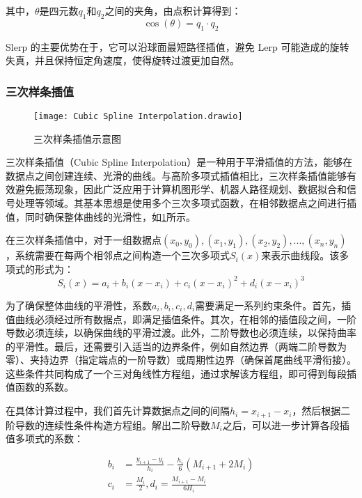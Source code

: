 其中，$\theta$是四元数$q_{1}$和$q_{2}$之间的夹角，由点积计算得到：
\begin{equation}
	\label{equ:Slerp:2}
	\cos(\theta)=q_{1} \cdot{q_{2}}
\end{equation}

Slerp 的主要优势在于，它可以沿球面最短路径插值，避免 Lerp 可能造成的旋转失真，并且保持恒定角速度，使得旋转过渡更加自然。
\subsubsection{三次样条插值}  
 \begin{figure}[htb]
	\texttt{[image: Cubic Spline Interpolation.drawio]}
	\caption[三次样条插值示意图]{三次样条插值示意图} %
	\label{fig:Cubic Spline Interpolation.drawio}
\end{figure}
三次样条插值（Cubic Spline Interpolation）是一种用于平滑插值的方法，能够在数据点之间创建连续、光滑的曲线。与高阶多项式插值相比，三次样条插值能够有效避免振荡现象，因此广泛应用于计算机图形学、机器人路径规划、数据拟合和信号处理等领域。其基本思想是使用多个三次多项式函数，在相邻数据点之间进行插值，同时确保整体曲线的光滑性，如\cref{fig:Cubic Spline Interpolation.drawio}所示。

在三次样条插值中，对于一组数据点$(x_{0},y_{0}),(x_{1},y_{1}),(x_{2},y_{2}),...,(x_{n},y_{n})$，系统需要在每两个相邻点之间构造一个三次多项式$S_{i}(x)$来表示曲线段。该多项式的形式为：
\begin{equation}
	\label{equ:Cubic Spline Interpolation 1}
	S_{i}(x) = a_{i} + b_{i}(x-x_{i}) + c_{i}(x-x_{i})^{2} + d_{i}(x-x_{i})^{3}  
\end{equation}

为了确保整体曲线的平滑性，系数$a_{i},b_{i},c_{i},d_{i}$需要满足一系列约束条件。首先，插值曲线必须经过所有数据点，即满足插值条件。其次，在相邻的插值段之间，一阶导数必须连续，以确保曲线的平滑过渡。此外，二阶导数也必须连续，以保持曲率的平滑性。最后，还需要引入适当的边界条件，例如自然边界（两端二阶导数为零）、夹持边界（指定端点的一阶导数）或周期性边界（确保首尾曲线平滑衔接）。这些条件共同构成了一个三对角线性方程组，通过求解该方程组，即可得到每段插值函数的系数。

在具体计算过程中，我们首先计算数据点之间的间隔$h_{i} = x_{i+1} - x_{i}$，然后根据二阶导数的连续性条件构造方程组。解出二阶导数$M_{i}$之后，可以进一步计算各段插值多项式的系数：

\begin{equation}
	\label{equ:Cubic Spline Interpolation 2}
	\begin{split}
		b_{i} &= \frac{y_{i+1} - y_{i}}{h_{i}} - \frac{h_{i}}{6}(M_{i+1} + 2M_{i})   \\
		c_{i} &= \frac{M_{i}}{2} ,d_{i} = \frac{M_{i+1} - M_{i}}{6H_{i}}
	\end{split}
\end{equation}

